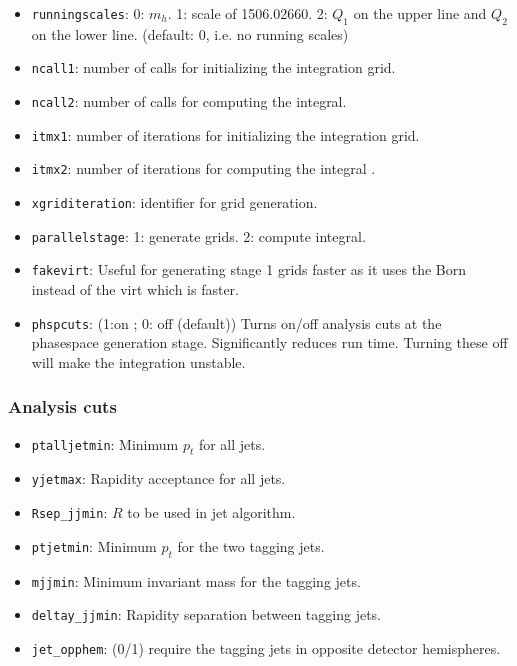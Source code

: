 \documentclass[12pt,a4]{article}
\begin{document}
\begin{itemize}
\item\texttt{runningscales}: 0: $m_h$. 1: scale of 1506.02660. 2: $Q_1$
  on the upper line and $Q_2$ on the lower line. (default: 0, i.e. no
  running scales)
                  
\item\texttt{ncall1}: number of calls for initializing the integration grid.
  
\item\texttt{ncall2}: number of calls for computing the integral.
  
\item\texttt{itmx1}: number of iterations for initializing the
  integration grid.
  
\item\texttt{itmx2}: number of iterations for computing the integral .
  
\item\texttt{xgriditeration}: identifier for grid generation.
  
\item\texttt{parallelstage}: 1: generate grids. 2: compute integral.

\item\texttt{fakevirt}: Useful for generating stage 1 grids faster as
  it uses the Born instead of the virt which is faster.

\item\texttt{phspcuts}: (1:on ; 0: off (default)) Turns on/off analysis
  cuts at the phasespace generation stage. Significantly reduces run
  time. Turning these off will make the integration unstable.
\end{itemize}

\subsubsection{Analysis cuts}
\begin{itemize}
\item\texttt{ptalljetmin}: Minimum $p_t$ for all jets.

\item\texttt{yjetmax}: Rapidity acceptance for all jets.

\item\texttt{Rsep\_jjmin}: $R$ to be used in jet algorithm.

\item\texttt{ptjetmin}: Minimum $p_t$ for the two tagging jets.

\item\texttt{mjjmin}: Minimum invariant mass for the tagging jets.

\item\texttt{deltay\_jjmin}: Rapidity separation between tagging jets.

\item\texttt{jet\_opphem}: (0/1) require the tagging jets in opposite
  detector hemispheres.
\end{itemize}
\end{document}

